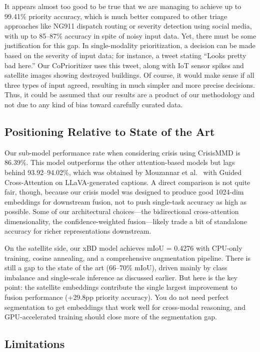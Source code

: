 \documentclass[journal]{IEEEtran}
\begin{document}
It appears almost too good to be true that we are managing to achieve up to 99.41\% priority accuracy, which is much better compared to other triage approaches like NG911 dispatch routing or severity detection using social media, with up to 85--87\% accuracy in spite of noisy input data. Yet, there must be some justification for this gap. In single-modality prioritization, a decision can be made based on the severity of input data; for instance, a tweet stating ``Looks pretty bad here.'' Our CoPrioritizer uses this tweet, along with IoT sensor spikes and satellite images showing destroyed buildings. Of course, it would make sense if all three types of input agreed, resulting in much simpler and more precise decisions. Thus, it could be assumed that our results are a product of our methodology and not due to any kind of bias toward carefully curated data.

\subsection{Positioning Relative to State of the Art}

Our sub-model performance rate when considering crisis using CrisisMMD is 86.39\%. This model outperforms the other attention-based models but lags behind 93.92--94.02\%, which was obtained by Mouzannar et al.~\cite{mouzannar2025guidedcross} with Guided Cross-Attention on LLaVA-generated captions.
A direct comparison is not quite fair, though, because our crisis model was designed to produce good 1024-dim embeddings for downstream fusion, not to push single-task accuracy as high as possible. Some of our architectural choices---the bidirectional cross-attention dimensionality, the confidence-weighted fusion---likely trade a bit of standalone accuracy for richer representations downstream.

On the satellite side, our xBD model achieves mIoU = 0.4276 with CPU-only training, cosine annealing, and a comprehensive augmentation pipeline. There is still a gap to the state of the art (66--70\% mIoU), driven mainly by class imbalance and single-scale inference as discussed earlier. But here is the key point: the satellite embeddings contribute the single largest improvement to fusion performance (+29.8pp priority accuracy). You do not need perfect segmentation to get embeddings that work well for cross-modal reasoning, and GPU-accelerated training should close more of the segmentation gap.

\subsection{Limitations}
\label{sec:limitations}
\end{document}
